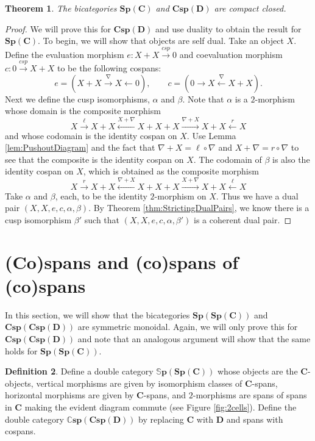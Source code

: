 \documentclass[11pt]{amsart}
\newcommand{\cat}[1]{\mathbf{#1}}
\newcommand{\from}{\colon}
\newcommand{\xto}[1]{\xrightarrow{#1}}
\newcommand{\tocospan}{\xrightarrow{\mathit{csp}}}
\newcommand{\bispmap}[1]{\mathbf{Sp(#1)}}
\newcommand{\bicspmap}[1]{\mathbf{Csp(#1)}}
\newcommand{\bispsp}[1]{\mathbf{Sp(Sp(#1))}}
\newcommand{\dblspsp}[1]{\mathbb{S}\mathbf{p(Sp(#1))}}
\newcommand{\bicspcsp}[1]{\mathbf{Csp(Csp(#1))}}
\newcommand{\dblcspcsp}[1]{\mathbb{C}\mathbf{sp(Csp(#1))}}
\newtheorem{thm}{Theorem}[section]
\theoremstyle{remark}
\theoremstyle{definition}
\newtheorem{defn}[thm]{Definition}
\begin{document}
\begin{thm}
	\label{thm:SpansMapsAreCCBicat}
	The bicategories $\bispmap{C}$ and $\bicspmap{D}$ are compact closed.
\end{thm}

\begin{proof}
	We will prove this for $\bicspmap{D}$ and use duality to obtain the result for $\bispmap{C}$. To begin, we will show that objects are self dual. Take an object $X$.  Define the evaluation morphism $e \from X + X \tocospan 0$ and coevaluation morphism $c \from 0 \tocospan X+X$ to be the following cospans:
	\[
		e = (X+X \xto{\nabla} X \gets 0), \quad \quad 
		c = (0 \to X \xleftarrow{\nabla} X+X).
	\]
	Next we define the cusp isomorphisms, $\alpha$ and $\beta$.
	Note that $\alpha$ is a $2$-morphism whose domain is the composite morphism
	\[
		X \xto{\ell}
		X+X \xleftarrow{X+\nabla}
		X+X+X \xto{\nabla +X}
		X+X \xleftarrow{r}
		X
	\]
	and whose codomain is the identity cospan on $X$.  Use Lemma \ref{lem:PushoutDiagram} and the fact that $\nabla+X = \ell \circ \nabla$ and $X + \nabla = r \circ \nabla$ to see that the composite is the identity cospan on $X$.  The codomain of $\beta$ is also the identity cospan on $X$, which is obtained as the composite morphism
	\[
		X \xto{r}
		X+X \xleftarrow{\nabla+X}
		X+X+X \xto{X+\nabla}
		X+X \xleftarrow{\ell}
		X
	\]
	Take $\alpha$ and $\beta$, each, to be the identity $2$-morphism on $X$. Thus we have a dual pair $(X,X,e,c,\alpha,\beta)$. By Theorem \ref{thm:StrictingDualPairs}, we know there is a cusp isomorphism $\beta'$ such that $(X,X,e,c,\alpha,\beta')$ is a coherent dual pair.  
\end{proof}

\section{(Co)spans and (co)spans of (co)spans}                  
\label{sec:SpansSpans}

In this section, we will show that the bicategories $\bispsp{C}$ and $\bicspcsp{D}$ are symmetric monoidal. Again, we will only prove this for $\bicspcsp{D}$ and note that an analogous argument will show that the same holds for $\bispsp{C}$.  

\begin{defn}
\label{def:DblCatSpanSpan}
	Define a double category $\dblspsp{C}$ whose objects are the $\cat{C}$-objects, vertical morphisms are given by isomorphism classes of $\cat{C}$-spans, horizontal morphisms are given by $\cat{C}$-spans, and $2$-morphisms are spans of spans in $\cat{C}$ making the evident diagram commute (see Figure \ref{fig:2cells}). Define the double category $\dblcspcsp{D}$ by replacing $\cat{C}$ with $\cat{D}$ and spans with cospans.  
\end{defn}
\end{document}
